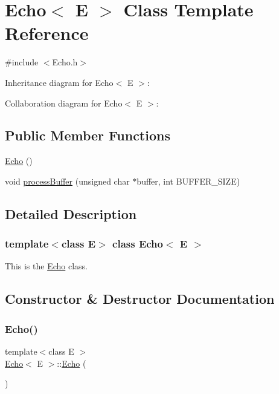 \hypertarget{classEcho}{}\section{Echo$<$ E $>$ Class Template Reference}
\label{classEcho}


{\ttfamily \#include $<$Echo.\+h$>$}



Inheritance diagram for Echo$<$ E $>$\+:


Collaboration diagram for Echo$<$ E $>$\+:
\subsection*{Public Member Functions}
\begin{DoxyCompactItemize}
\item 
\hyperlink{classEcho_a445e0cac428a957e2f4d97d28bb2ff75}{Echo} ()
\item 
void \hyperlink{classEcho_a3e23a70d522b79ef1e5b9df90c2af183}{process\+Buffer} (unsigned char $\ast$buffer, int B\+U\+F\+F\+E\+R\+\_\+\+S\+I\+ZE)
\end{DoxyCompactItemize}


\subsection{Detailed Description}
\subsubsection*{template$<$class E$>$\newline
class Echo$<$ E $>$}

This is the \hyperlink{classEcho}{Echo} class. 

\subsection{Constructor \& Destructor Documentation}
\mbox{\label{classEcho_a445e0cac428a957e2f4d97d28bb2ff75}} 
\subsubsection{\texorpdfstring{Echo()}{Echo()}}
{\footnotesize\ttfamily template$<$class E $>$ \\
\hyperlink{classEcho}{Echo}$<$ E $>$\+::\hyperlink{classEcho}{Echo} (\begin{DoxyParamCaption}{ }\end{DoxyParamCaption})}


